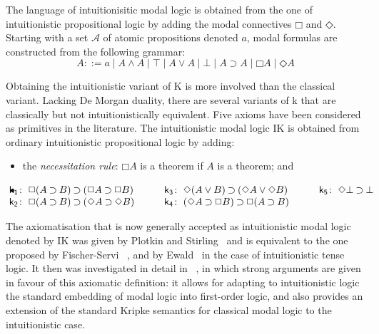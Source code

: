 \documentclass[twoside]{aiml18}
\newcommand*{\ax}[1]{\mathsf{#1}}
\newcommand*{\kax}[1][]		{\ax{k_{#1}}}
\newcommand*{\NOT}{\neg}
\newcommand*{\AND}{\mathbin{\wedge}}
\newcommand*{\TOP}{\mathord{\top}}
\newcommand*{\OR}{\mathbin{\vee}}
\newcommand*{\BOT}{\mathord{\bot}}
\newcommand*{\IMP}{\mathbin{\supset}}
\newcommand*{\BOX}{\mathord{\Box}}
\newcommand*{\DIA}{\mathord{\Diamond}}
\begin{document}
	
	The language of {intuitionisitic modal logic} is obtained from the one of intuitionistic propositional logic by adding the modal connectives $\BOX$ and $\DIA$. %
	Starting with a set $\mathcal{A}$ of atomic propositions denoted $a$, modal formulas are constructed from the following grammar:
	$$
	A  ::=
	a \mid A \AND A \mid \TOP \mid A \OR A \mid \BOT \mid A \IMP A \mid \BOX A \mid \DIA A
	$$

Obtaining the intuitionistic variant of K is more involved than the classical variant. Lacking
De Morgan duality, there are several variants of k that are classically but not intuitionistically
equivalent. Five axioms have been considered as primitives in the literature. The intuitionistic
modal logic IK is obtained from ordinary intuitionistic propositional logic by adding:
\begin{itemize}
\item the \emph{necessitation rule}: $\BOX A$ is a theorem if $A$ is a theorem; and
\item 
\begin{equation*}
\label{eq:ik}\hskip-2em
\begin{array}[t]{r@{\;}l}
\kax[1]\colon&\BOX(A\IMP B)\IMP(\BOX A\IMP\BOX B)\\%
\kax[2]\colon&\BOX(A\IMP B)\IMP(\DIA A\IMP\DIA B)\\%
\end{array}
\qquad
\begin{array}[t]{r@{\;}l}
\kax[3]\colon&\DIA(A\OR B)\IMP(\DIA A\OR\DIA B)\\%
\kax[4]\colon&(\DIA A\IMP \BOX B)\IMP\BOX(A\IMP B)\\%
\end{array}
\qquad
\begin{array}[t]{r@{\;}l}
\kax[5]\colon&\DIA\BOT\IMP\BOT
\end{array}
\end{equation*}
\end{itemize}


The axiomatisation that is now generally accepted as intuitionistic modal logic denoted by IK was given by Plotkin and Stirling~\cite{Plotkin} and is equivalent to the one proposed by Fischer-Servi ~\cite{Fischer}, and by Ewald~\cite{Ewald} in the case of intuitionistic tense logic. 
%
It then was investigated in detail in ~\cite{Simpson}, in which strong arguments are given in favour of this axiomatic definition: 
%
it allows for adapting to intuitionistic logic the standard embedding of modal logic into first-order logic, and also provides an extension of the standard Kripke semantics for classical modal logic to the intuitionistic case.
\end{document}
